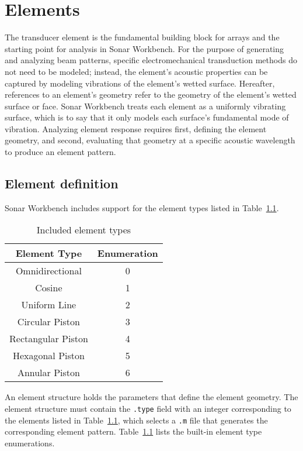 \chapter{Elements}\label{ch:element}

The transducer element is the fundamental building block for arrays and the starting point for analysis in Sonar Workbench. For the purpose of generating and analyzing beam patterns, specific electromechanical transduction methods do not need to be modeled; instead, the element's acoustic properties can be captured by modeling vibrations of the element's wetted surface. Hereafter, references to an element's geometry refer to the geometry of the element's wetted surface or face. Sonar Workbench treats each element as a uniformly vibrating surface, which is to say that it only models each surface's fundamental mode of vibration. Analyzing element response requires first, defining the element geometry, and second, evaluating that geometry at a specific acoustic wavelength to produce an element pattern.

\section{Element definition}

Sonar Workbench includes support for the element types listed in Table~\ref{tab:ElementTypes}. 

\begin{table}[!ht]
	\begin{center}
		\caption{Included element types}
		\label{tab:ElementTypes}
		\begin{tabular}{c|c} 
			\textbf{Element Type} & \textbf{Enumeration} \\
			\hline
			Omnidirectional  & 0 \\
			Cosine & 1 \\
			Uniform Line & 2 \\
			Circular Piston & 3 \\
			Rectangular Piston & 4 \\
			Hexagonal Piston & 5 \\
			Annular Piston & 6 \\
		\end{tabular}
	\end{center}
\end{table}

An element structure holds the parameters that define the element geometry. The element structure must contain the \texttt{.type} field with an integer corresponding to the elements listed in Table~\ref{tab:ElementTypes}, which selects a \texttt{.m} file that generates the corresponding element pattern. Table~\ref{tab:ElementTypes} lists the built-in element type enumerations.


